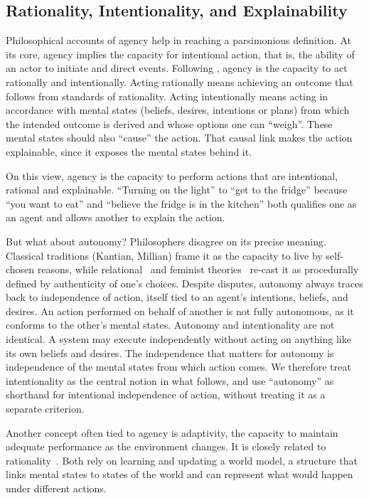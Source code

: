 \documentclass[letterpaper]{article} %
\theoremstyle{definition}
\begin{document}
\subsection{Rationality, Intentionality, and Explainability}

Philosophical accounts of agency help in reaching a parsimonious definition. At its core, agency implies the capacity for intentional action, that is, the ability of an actor to initiate and direct events. Following \citet{davidsonEssaysActionsEvents1980}, agency is the capacity to act rationally and intentionally. Acting rationally means achieving an outcome that follows from standards of rationality. Acting intentionally means acting in accordance with mental states (beliefs, desires, intentions or plans) from which the intended outcome is derived and whose options one can ``weigh''. These mental states should also ``cause'' the action. That causal link makes the action explainable, since it exposes the mental states behind it.

On this view, agency is the capacity to perform actions that are intentional, rational and explainable. ``Turning on the light'' to ``get to the fridge'' because ``you want to eat'' and ``believe the fridge is in the kitchen'' both qualifies one as an agent and allows another to explain the action.

But what about autonomy? Philosophers disagree on its precise meaning. Classical traditions (Kantian, Millian) frame it as the capacity to live by self-chosen reasons, while relational~\citep{oshanaRelationalAutonomy2020} and feminist theories~\citep{mackenzieFeministConceptionsAutonomy2017} re-cast it as procedurally defined by authenticity of one's choices. Despite disputes, autonomy always traces back to independence of action, itself tied to an agent's intentions, beliefs, and desires. An action performed on behalf of another is not fully autonomous, as it conforms to the other's mental states. Autonomy and intentionality are not identical. A system may execute independently without acting on anything like its own beliefs and desires. The independence that matters for autonomy is independence of the mental states from which action comes. We therefore treat intentionality as the central notion in what follows, and use ``autonomy'' as shorthand for intentional independence of action, without treating it as a separate criterion.

Another concept often tied to agency is adaptivity, the capacity to maintain adequate performance as the environment changes. It is closely related to rationality~\citep{shavitPracticesGoverningAgentic}. Both rely on learning and updating a world model, a structure that links mental states to states of the world and can represent what would happen under different actions.
\end{document}

